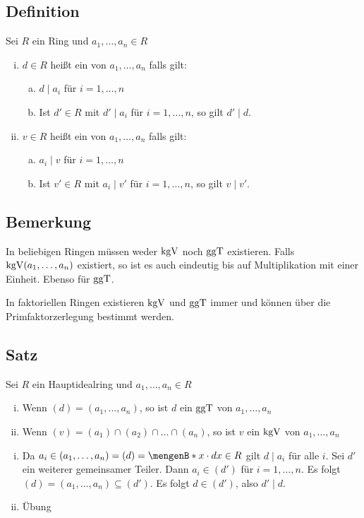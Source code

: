 \subsection[Definition: $\ggT$ und $\kgV$]{Definition} %
\label{sub:713}
Sei $R$ ein Ring und $a_1, \ldots , a_n \in R$
\begin{enumerate}[i)]
	\item $d \in R$ heißt ein  von $a_1, \ldots , a_n$ falls gilt:
	\begin{enumerate}[(a)]
		\item $d \mid a_i$ für $i=1,\ldots ,n$
		\item Ist $d' \in R$ mit $d' \mid a_i$ für $i=1,\ldots ,n$, so gilt $d' \mid d$.
	\end{enumerate} 
	\item $v \in R$ heißt ein  von $a_1, \ldots , a_n$ falls gilt:
	\begin{enumerate}[(a)]
		\item $a_i \mid v$ für $i=1, \ldots ,n$
		\item Ist $v' \in R$ mit $a_i \mid v'$ für $i=1,\ldots ,n$, so gilt $v \mid v'$.
	\end{enumerate} 
\end{enumerate}

\subsection[Bemerkung: Existenz von $\ggT$ und $\kgV$]{Bemerkung} %
\label{sub:714}
In beliebigen Ringen müssen weder $\kgV$ noch $\ggT$ existieren. Falls $\operatorname{kgV} (a_1, \ldots , a_n)$ existiert, so ist es auch eindeutig bis auf Multiplikation mit einer Einheit. Ebenso für $\ggT$.

In faktoriellen Ringen existieren $\kgV$ und $\ggT$ immer und können über die Primfaktorzerlegung bestimmt werden.

\subsection[Satz: Zusammenhang zwischen Idealen und $\ggT$ und $\kgV$]{Satz} %
\label{sub:715}
Sei $R$ ein Hauptidealring und $a_1,\ldots ,a_n \in R$
\begin{enumerate}[i)]
	\item Wenn $(d) = (a_1, \ldots ,a_n)$, so ist $d$ ein $\ggT$ von $a_1, \ldots ,a_n$
	\item Wenn $(v) = (a_1) \cap (a_2) \cap \ldots \cap (a_n)$, so ist $v$ ein $\kgV$ von $a_1, \ldots , a_n$
\end{enumerate}
\begin{enumerate}[i)]
	\item Da $a_i \in (a_1, \ldots ,a_n) = (d) =  \set[x \cdot d]{x \in R} $ gilt $d \mid a_i$ für alle $i$. Sei $d'$ ein weiterer gemeinsamer Teiler. Dann $a_i \in (d')$
	für $i=1,\ldots ,n$. Es folgt $(d) = (a_1, \ldots , a_n) \subseteq (d')$. Es folgt $d \in (d')$, also $d' \mid d$.
	\item Übung
\end{enumerate}

